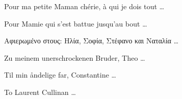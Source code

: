 \begin{dedication} 

\vspace{1cm}
{\selectfont \foreignlanguage{french} {Pour ma petite Maman ch\'erie, \`a qui je dois tout \ldots}}

\vspace{1cm}
{\selectfont \foreignlanguage{french} {Pour Mamie qui s'est battue jusqu'au bout \ldots}}

\vspace{1cm}
{ \foreignlanguage{greek} { Αφιερωμένο στους: Ηλία, Σοφία, Στέφανο και Ναταλία \ldots} }

\vspace{1cm}
{ \foreignlanguage{german} {Zu meinem unerschrockenen Bruder, Theo \ldots} }

\vspace{1cm}
{ \foreignlanguage{danish} {Til min åndelige far, Constantine \ldots} }

\vspace{1cm}
To Laurent Cullinan \ldots

\end{dedication}

